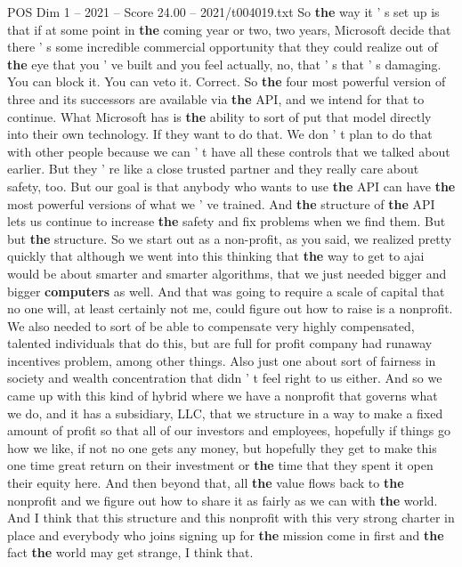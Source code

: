 \begin{textsample}{POS Dim 1 – 2021 – Score 24.00 – 2021/t004019.txt}
So \textbf{the} way it ' s set up is that if at some point in \textbf{the} coming year or two, two years, Microsoft decide that there ' s some incredible commercial opportunity that they could realize out of \textbf{the} eye that you ' ve built and you feel actually, no, that ' s that ' s damaging.
You can block it.
You can veto it.
Correct.
So \textbf{the} four most powerful version of three and its successors are available via \textbf{the} API, and we intend for that to continue.
What Microsoft has is \textbf{the} ability to sort of put that model directly into their own technology.
If they want to do that.
We don ' t plan to do that with other people because we can ' t have all these controls that we talked about earlier.
But they ' re like a close trusted partner and they really care about safety, too.
But our goal is that anybody who wants to use \textbf{the} API can have \textbf{the} most powerful versions of what we ' ve trained.
And \textbf{the} structure of \textbf{the} API lets us continue to increase \textbf{the} safety and fix problems when we find them.
But but \textbf{the} structure.
So we start out as a non-profit, as you said, we realized pretty quickly that although we went into this thinking that \textbf{the} way to get to ajai would be about smarter and smarter algorithms, that we just needed bigger and bigger \textbf{computers} as well.
And that was going to require a scale of capital that no one will, at least certainly not me, could figure out how to raise is a nonprofit.
We also needed to sort of be able to compensate very highly compensated, talented individuals that do this, but are full for profit company had runaway incentives problem, among other things.
Also just one about sort of fairness in society and wealth concentration that didn ' t feel right to us either.
And so we came up with this kind of hybrid where we have a nonprofit that governs what we do, and it has a subsidiary, LLC, that we structure in a way to make a fixed amount of profit so that all of our investors and employees, hopefully if things go how we like, if not no one gets any money, but hopefully they get to make this one time great return on their investment or \textbf{the} time that they spent it open their equity here.
And then beyond that, all \textbf{the} value flows back to \textbf{the} nonprofit and we figure out how to share it as fairly as we can with \textbf{the} world.
And I think that this structure and this nonprofit with this very strong charter in place and everybody who joins signing up for \textbf{the} mission come in first and \textbf{the} fact \textbf{the} world may get strange, I think that.

\end{textsample}
